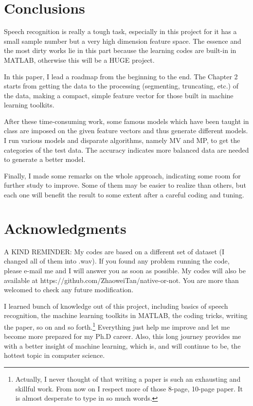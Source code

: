 \documentclass{sig-alternate}
\begin{document}
\section{Conclusions}
Speech recognition is really a tough task, especially in this project for it has a small sample number but a very high dimension feature space. The essence and the most dirty works lie in this part because the learning codes are built-in in MATLAB, otherwise this will be a HUGE project.

In this paper, I lead a roadmap from the beginning to the end. The Chapter 2 starts from getting the data to the processing (segmenting, truncating, etc.) of the data, making a compact, simple feature vector for those built in machine learning toolkits. 

After these time-consuming work, some famous models which have been taught in class are imposed on the given feature vectors and thus generate different models. I run various models and disparate algorithms, namely MV and MP, to get the categories of the test data. The accuracy indicates more balanced data are needed to generate a better model.

Finally, I made some remarks on the whole approach, indicating some room for further study to improve. Some of them may be easier to realize than others, but each one will benefit the result to some extent after a careful coding and tuning.

\section{Acknowledgments}
A KIND REMINDER: My codes are based on a different set of dataset (I changed all of them into .wav). If you found any problem running the code, please e-mail me and I will answer you as soon as possible. My codes will also be available at https://github.com/ZhaoweiTan/native-or-not. You are more than welcomed to check any future modification.

I learned bunch of knowledge out of this project, including basics of speech recognition, the machine learning toolkits in MATLAB, the coding tricks, writing the paper, so on and so forth.\footnote{Actually, I never thought of that writing a paper is such an exhausting and skillful work. From now on I respect more of those 8-page, 10-page paper. It is almost desperate to type in so much words.} Everything just help me improve and let me become more prepared for my Ph.D career. Also, this long journey provides me with a better insight of machine learning, which is, and will continue to be, the hottest topic in computer science.
\end{document}

